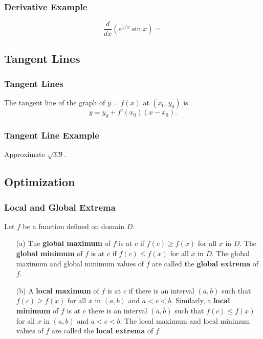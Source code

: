 \documentclass{beamer}
\begin{document}
\begin{frame}
\frametitle{Derivative Example}
\begin{Example}
$$
\frac{d}{dx}\left(e^{1/x}\sin x\right) = 
$$
\end{Example}

\end{frame}

\subsection{Tangent Lines}


\begin{frame}
\frametitle{Tangent Lines}
The tangent line of the graph of $y = f(x)$ at $(x_0, y_0)$ is
$$
y = y_0 + f'(x_0)(x - x_0).
$$
\end{frame}

\begin{frame}[t]
\frametitle{Tangent Line Example}
\begin{Example}
Approximate $\sqrt{3.9}$.
\end{Example}

\end{frame}


\subsection{Optimization}

\begin{frame}
\frametitle{Local and Global Extrema}

\begin{Definition}
Let $f$ be a function defined on domain $D$.\small
\begin{enumerate}
\item[(a)] The {\bf global maximum} of $f$ is at $c$ if $f(c)\geq f(x)$ for all $x$ in $D$. The {\bf global minimum} of $f$ is at $c$ if $f(c) \leq f(x)$ for all $x$ in $D$. The global maximum and global minimum values of $f$ are called the {\bf global extrema} of $f$.
\item[(b)] A {\bf local maximum} of $f$ is at $c$ if there is an interval $(a, b)$ such that $f(c) \geq f(x)$ for all $x$ in $(a, b)$ and $a < c < b$. Similarly, a {\bf local minimum} of $f$ is at $c$ there is an interval $(a, b)$ such that $f(c) \leq f(x)$ for all $x$ in $(a, b)$ and $a < c < b$. The local maximum and local minimum values of $f$ are called the {\bf local extrema} of $f$.
\end{enumerate}
\end{Definition}
\end{frame}
\end{document}
